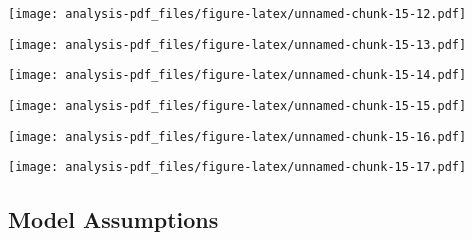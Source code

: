 \documentclass[
]{article}
\newenvironment{Shaded}{\begin{snugshade}}{\end{snugshade}}
\newcommand{\KeywordTok}[1]{\textcolor[rgb]{0.13,0.29,0.53}{\textbf{#1}}}
\newcommand{\NormalTok}[1]{#1}
\newcommand{\OperatorTok}[1]{\textcolor[rgb]{0.81,0.36,0.00}{\textbf{#1}}}
\begin{document}
\texttt{[image: analysis-pdf\_files/figure-latex/unnamed-chunk-15-12.pdf]}

\begin{Shaded}
\end{Shaded}

\texttt{[image: analysis-pdf\_files/figure-latex/unnamed-chunk-15-13.pdf]}

\begin{Shaded}
\end{Shaded}

\texttt{[image: analysis-pdf\_files/figure-latex/unnamed-chunk-15-14.pdf]}

\begin{Shaded}
\end{Shaded}

\texttt{[image: analysis-pdf\_files/figure-latex/unnamed-chunk-15-15.pdf]}

\begin{Shaded}
\end{Shaded}

\texttt{[image: analysis-pdf\_files/figure-latex/unnamed-chunk-15-16.pdf]}

\begin{Shaded}
\end{Shaded}

\texttt{[image: analysis-pdf\_files/figure-latex/unnamed-chunk-15-17.pdf]}

\hypertarget{model-assumptions}{%
\subsection{Model Assumptions}\label{model-assumptions}}
\end{document}
